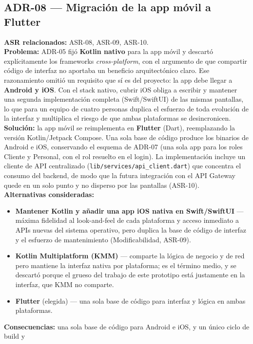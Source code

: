 \documentclass[11pt,a4paper]{article}
\begin{document}
\subsection*{ADR-08 --- Migración de la app móvil a Flutter}
\textbf{ASR relacionados:} ASR-08, ASR-09, ASR-10.\\
\textbf{Problema:} ADR-05 fijó \textbf{Kotlin nativo} para la app móvil y descartó explícitamente los
frameworks \textit{cross-platform}, con el argumento de que compartir código de interfaz no aportaba
un beneficio arquitectónico claro. Ese razonamiento omitió un requisito que sí es del proyecto: la
app debe llegar a \textbf{Android y iOS}. Con el stack nativo, cubrir iOS obliga a escribir y
mantener una segunda implementación completa (Swift/SwiftUI) de las mismas pantallas, lo que para un
equipo de cuatro personas duplica el esfuerzo de toda evolución de la interfaz y multiplica el riesgo
de que ambas plataformas se desincronicen.\\
\textbf{Solución:} la app móvil se reimplementa en \textbf{Flutter} (Dart), reemplazando la versión
Kotlin/Jetpack Compose. Una sola base de código produce los binarios de Android e iOS, conservando el
esquema de ADR-07 (una sola app para los roles Cliente y Personal, con el rol resuelto en el login).
La implementación incluye un cliente de API centralizado (\texttt{lib/services/api\_client.dart}) que
concentra el consumo del backend, de modo que la futura integración con el API Gateway quede en un
solo punto y no disperso por las pantallas (ASR-10).\\
\textbf{Alternativas consideradas:}
\begin{itemize}
  \item \textbf{Mantener Kotlin y añadir una app iOS nativa en Swift/SwiftUI} --- máxima fidelidad al
  look-and-feel de cada plataforma y acceso inmediato a APIs nuevas del sistema operativo, pero
  duplica la base de código de interfaz y el esfuerzo de mantenimiento (Modificabilidad, ASR-09).
  \item \textbf{Kotlin Multiplatform (KMM)} --- comparte la lógica de negocio y de red pero mantiene
  la interfaz nativa por plataforma; es el término medio, y se descartó porque el grueso del trabajo
  de este prototipo está justamente en la interfaz, que KMM no comparte.
  \item \textbf{Flutter} (elegida) --- una sola base de código para interfaz y lógica en ambas
  plataformas.
\end{itemize}
\textbf{Consecuencias:} una sola base de código para Android e iOS, y un único ciclo de build y
\end{document}
